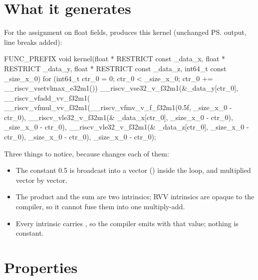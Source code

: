 \section{What it generates}

For the assignment  on float fields,  produces this
kernel (unchanged \ps{} output, line breaks added):
\begin{ccode}
FUNC_PREFIX void kernel(float * RESTRICT const _data_x, float * RESTRICT _data_y,
                        float * RESTRICT const _data_z, int64_t const _size_x_0)
{
   for (int64_t ctr_0 = 0; ctr_0 < _size_x_0; ctr_0 += __riscv_vsetvlmax_e32m1())
   {
      __riscv_vse32_v_f32m1(&_data_y[ctr_0],
         __riscv_vfadd_vv_f32m1(
            __riscv_vfmul_vv_f32m1(__riscv_vfmv_v_f_f32m1(0.5f, _size_x_0 - ctr_0),
                                   __riscv_vle32_v_f32m1(& _data_x[ctr_0], _size_x_0 - ctr_0),
                                   _size_x_0 - ctr_0),
            __riscv_vle32_v_f32m1(& _data_z[ctr_0], _size_x_0 - ctr_0),
            _size_x_0 - ctr_0),
         _size_x_0 - ctr_0);
   }
}
\end{ccode}
Three things to notice, because  changes each of them:
\begin{itemize}
  \item The constant 0.5 is broadcast into a vector () inside the loop,
    and multiplied vector by vector.
  \item The product and the sum are two intrinsics; RVV intrinsics are opaque to the
    compiler, so it cannot fuse them into one multiply-add.
  \item Every intrinsic carries , so the compiler emits
     with that value; nothing is constant.
\end{itemize}

\section{Properties}

